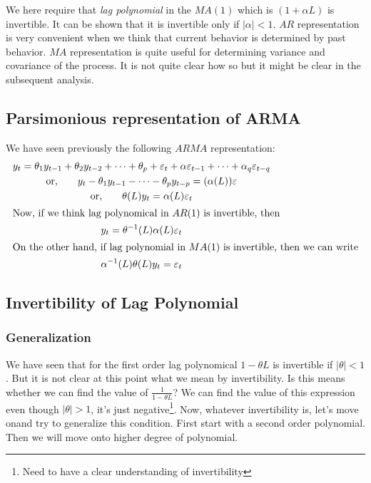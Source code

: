 \documentclass{book}
\begin{document}
We here require that \textit{lag polynomial} in the $MA(1)$ which is $(1+\alpha L)$ is invertible. It can be shown that it is invertible only if $|\alpha|<1$. $AR$ representation is very convenient when we think that current behavior is determined by past behavior. $MA$ representation is quite useful for determining variance and covariance of the process. It is not quite clear how so but it might be clear in the subsequent analysis. 
\subsection{Parsimonious representation of ARMA}
We have seen previously the following $ARMA$ representation:
\begin{gather}
    y_t  =\theta_1 y_{t-1}+\theta_2 y_{t-2}+\dotsb+\theta_p+\varepsilon_t+\alpha \varepsilon_{t-1}+\dotsb+\alpha_q \varepsilon_{t-q} \\
    \text{or,} \qquad y_t-\theta_1 y_{t-1}-\dotsb-\theta_p y_{t-p}  =(\alpha(L))\varepsilon \\
\text{or,} \qquad \theta (L) y_t  =\alpha (L) \varepsilon_t \\
\intertext{Now, if we think lag polynomical in $AR(1)$ is invertible, then}
y_t  =\theta^{-1}(L) \alpha (L) \varepsilon_t \\
\intertext{On the other hand, if lag polynomial in  $MA(1)$ is invertible, then we can write}
\alpha^{-1}(L) \theta (L) y_t  =\varepsilon_t
    \label{eq:eqpararma}
\end{gather}
\subsection{Invertibility of Lag Polynomial}
\subsubsection{Generalization}
We have seen that for the first order lag polynomical $1-\theta L$ is invertible if $|\theta|<1$. But it is not clear at this point what we mean by invertibility. Is this means whether we can find the value of $\frac{1}{1-\theta L}$? We can find the value of this expression even though $|\theta|>1$, it's just negative\footnote{Need to have a clear understanding of invertibility}. Now, whatever invertibility is, let's move onand try to generalize this condition. First start with a second order polynomial. Then we will move onto higher degree of polynomial. 
\end{document}
